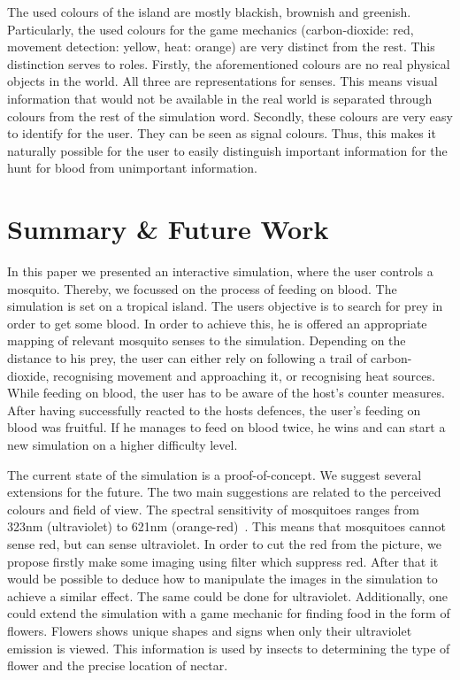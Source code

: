 \documentclass{sig-alternate-05-2015}
\begin{document}
The used colours of the island are mostly blackish, brownish and greenish. Particularly, the used colours for the game mechanics (carbon-dioxide: red, movement detection: yellow, heat: orange) are very distinct from the rest. This distinction serves to roles. Firstly, the aforementioned colours are no real physical objects in the world. All three are representations for senses. This means visual information that would not be available in the real world is separated through colours from the rest of the simulation word. Secondly, these colours are very easy to identify for the user. They can be seen as signal colours. Thus, this makes it naturally possible for the user to easily distinguish important information for the hunt for blood from unimportant information. 


\section{Summary \& Future Work}
\label{sec:summary}

In this paper we presented an interactive simulation, where the user controls a mosquito. Thereby, we focussed on the process of feeding on blood. The simulation is set on a tropical island. The users objective is to search for prey in order to get some blood. In order to achieve this, he is offered an appropriate mapping of relevant mosquito senses to the simulation. Depending on the distance to his prey, the user can either rely on following a trail of carbon-dioxide, recognising movement and approaching it, or recognising heat sources. While feeding on blood, the user has to be aware of the host's counter measures. After having successfully reacted to the hosts defences, the user's feeding on blood was fruitful. If he manages to feed on blood twice, he wins and can start a new simulation on a higher difficulty level.


The current state of the simulation is a proof-of-concept. We suggest several extensions for the future. 
The two main suggestions are related to the perceived colours and field of view. The spectral sensitivity of mosquitoes ranges from 323nm (ultraviolet) to 621nm (orange-red)~\cite{muir1992}. This means that mosquitoes cannot sense red, but can sense ultraviolet. In order to cut the red from the picture, we propose firstly make some imaging using filter which suppress red. After that it would be possible to deduce how to manipulate the images in the simulation to achieve a similar effect. The same could be done for ultraviolet. Additionally, one could extend the simulation with a game mechanic for finding food in the form of flowers. Flowers shows unique shapes and signs when only their ultraviolet emission is viewed. This information is used by insects to determining the type of flower and the precise location of nectar.
\end{document}
